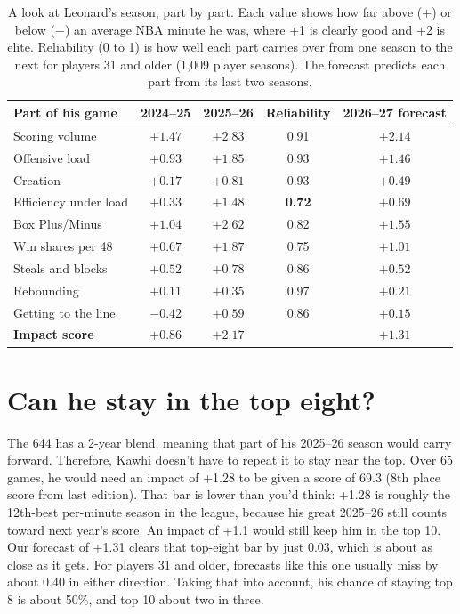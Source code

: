 \documentclass[11pt]{article}
\begin{document}
\begin{table}[H]
\centering\small
\caption{A look at Leonard's season, part by part. Each value shows how far above (+) or below
($-$) an average NBA minute he was, where +1 is clearly good and +2 is elite. Reliability (0 to 1)
is how well each part carries over from one season to the next for players 31 and older (1,009
player seasons). The forecast predicts each part from its last two seasons.}
\begin{tabular}{lcccc}
\toprule
Part of his game & 2024--25 & 2025--26 & Reliability & 2026--27 forecast \\
\midrule
Scoring volume & $+1.47$ & $+2.83$ & 0.91 & $+2.14$ \\
Offensive load & $+0.93$ & $+1.85$ & 0.93 & $+1.46$ \\
Creation & $+0.17$ & $+0.81$ & 0.93 & $+0.49$ \\
Efficiency under load & $+0.33$ & $\mathbf{+1.48}$ & \textbf{0.72} & $+0.69$ \\
Box Plus/Minus & $+1.04$ & $+2.62$ & 0.82 & $+1.55$ \\
Win shares per 48 & $+0.67$ & $+1.87$ & 0.75 & $+1.01$ \\
Steals and blocks & $+0.52$ & $+0.78$ & 0.86 & $+0.52$ \\
Rebounding & $+0.11$ & $+0.35$ & 0.97 & $+0.21$ \\
Getting to the line & $-0.42$ & $+0.59$ & 0.86 & $+0.15$ \\
\midrule
\textbf{Impact score} & $+0.86$ & $\mathbf{+2.17}$ & & $\mathbf{+1.31}$ \\
\bottomrule
\end{tabular}
\label{tab:anatomy}
\end{table}

\section*{Can he stay in the top eight?}

The 644 has a 2-year blend, meaning that part of his 2025--26 season would carry forward.
Therefore, Kawhi doesn't have to repeat it to stay near the top. Over 65 games, he would need an
impact of +1.28 to be given a \gravity{} score of 69.3 (8th place score from last
edition). That bar is lower than you'd think: +1.28
is roughly the 12th-best per-minute season in the league, because his great 2025--26 still counts
toward next year's score. An impact of +1.1 would still keep him in the top 10. Our forecast of
+1.31 clears that top-eight bar by just 0.03, which is about as close as it gets. For players 31
and older, forecasts like this one usually miss by about 0.40 in either direction. Taking that into
account, his chance of staying top 8 is about 50\%, and top 10 about two in three.
\end{document}
